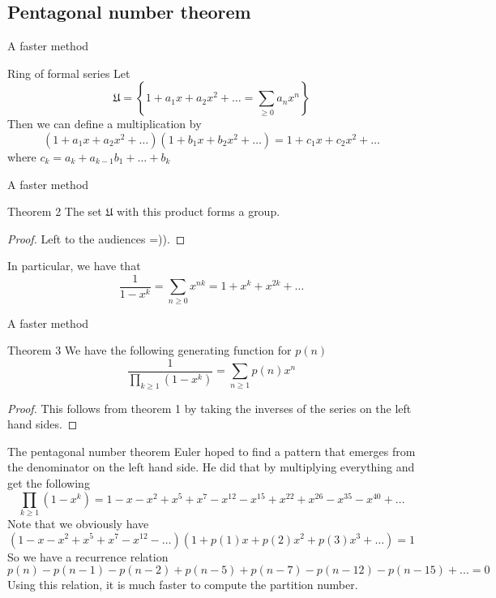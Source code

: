 \documentclass[pdf]{beamer}
\begin{document}
\subsection{Pentagonal number theorem}
\begin{frame}{A faster method}
    \begin{block}{Ring of formal series}
        Let
        \[\mathfrak{U} = \left\lbrace 1+a_1x+a_2x^2+\ldots = \sum_{\ge 0} a_nx^n\right\rbrace\]
        Then we can define a multiplication by
        \[(1+a_1x+a_2x^2+\ldots)(1+b_1x+b_2x^2+\ldots) =1+c_1x+c_2x^2+\ldots\]
        where $c_k = a_k + a_{k-1}b_1+\ldots+b_k$
    \end{block}
\end{frame}
\begin{frame}{A faster method}
    \begin{block}{Theorem 2}
        The set $\mathfrak{U}$ with this product forms a group.
    \end{block}
    \begin{proof}
        Left to the audiences =)).
    \end{proof}
    In particular, we have that
    \[\dfrac{1}{1-x^k} = \sum_{n \ge 0} x^{nk} = 1+ x^k+x^{2k}+\ldots\]
\end{frame}
\begin{frame}{A faster method}
    \begin{block}{Theorem 3}
        We have the following generating function for $p(n)$
        \[
            \dfrac{1}{\prod_{k \ge 1} (1-x^k)} = \sum_{n \ge 1}p(n)x^n
        \]
    \end{block}\pause
    \begin{proof}
        This follows from theorem 1 by taking the inverses of the series on the left hand sides.
    \end{proof}
\end{frame}
\begin{frame}{The pentagonal number theorem}
    Euler hoped to find a pattern that emerges from the denominator on the left hand side. He did that by multiplying everything and get the following
    \[\prod_{k \ge 1} (1-x^k) = 1-x-x^2+x^5+x^7-x^{12}-x^{15}+x^{22}+x^{26}-x^{35}-x^{40}+\ldots\]
    \pause
    Note that we obviously have
    \[(1-x-x^2+x^5+x^7-x^{12}-\ldots)(1+p(1)x+p(2)x^2+p(3)x^3+\ldots)=1\]\pause
    So we have a recurrence relation
    \[p(n)-p(n-1)-p(n-2)+p(n-5)+p(n-7)-p(n-12)-p(n-15)+...=0\]
    Using this relation, it is much faster to compute the partition number.
\end{frame}
\end{document}
